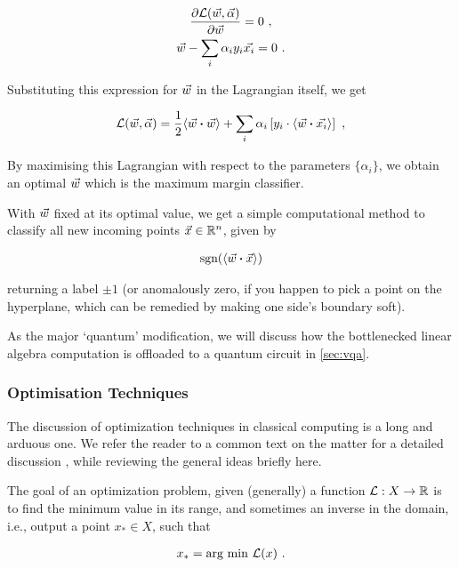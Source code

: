 \begin{gather}
    \frac{\partial \mathcal{L}(\vec{w}, \vec{\alpha})}{\partial \vec{w}} = 0~,\nonumber\\
    \vec{w} - \sum_i \alpha_i y_i \vec{x_i} = 0~.
\end{gather}

Substituting this expression for \(\vec{w}\) in the Lagrangian itself, we get

\begin{gather}
    \mathcal{L}(\vecw, \vec{\alpha}) = \frac{1}{2} \innerprod{\vecw}{\vecw} + \sum_i \alpha_i \left[y_i \cdot \innerprod{\vecw}{\vec{x_i}}\right]~,
\end{gather}

By maximising this Lagrangian with respect to the parameters \(\{\alpha_i\}\),
we obtain an optimal \(\vec{w}\) which is the maximum margin classifier.

With \(\vec{w}\) fixed at its optimal value, we get a simple computational method
to classify all new incoming points \(\vec{x} \in \mathbb{R}^n\), given by

\begin{gather}
    \text{sgn}(\innerprod{\vecw}{\vecx})
\end{gather}

returning a label \(\pm 1\) (or anomalously zero, if you happen to pick a point
on the hyperplane, which can be remedied by making one side's boundary soft).

As the major `quantum' modification, we will discuss how the bottlenecked linear
algebra computation is offloaded to a quantum circuit in \autoref{sec:vqa}.

\subsubsection{Optimisation Techniques}
The discussion of optimization techniques in classical computing is a long and
arduous one. We refer the reader to a common text on the matter for a detailed
discussion \cite{boyd2004convex,nocedal2006numerical}, while reviewing the
general ideas briefly here.

The goal of an optimization problem, given (generally) a function
\(\mathcal{L}:X\to\mathbb{R}\) is to find the minimum value in its range, and sometimes an
inverse in the domain, i.e., output a point \(x_* \in X\), such that

\begin{gather*}
    x_* = \text{arg min } \mathcal{L}(x)~.
\end{gather*}

